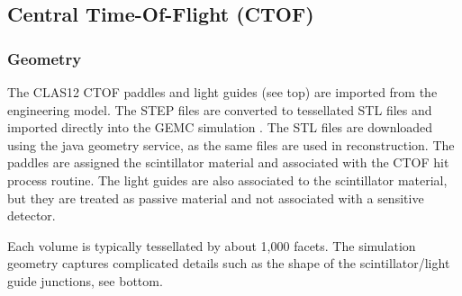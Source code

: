 \subsection{Central Time-Of-Flight (CTOF)} \label{sec:ctof}

\subsubsection{Geometry}

The CLAS12 CTOF paddles and light guides (see  top) are imported from the engineering model. The STEP files are converted to tessellated STL files and imported
directly into the GEMC simulation \cite{gemcCad}. The STL files are downloaded using the java geometry service, as the same files are used in reconstruction.
The paddles are assigned the scintillator material and associated with the CTOF hit process routine.
The light guides are also associated to the scintillator material, but they are treated as passive material and not associated with a sensitive detector.

Each volume is typically tessellated by about 1,000 facets. The simulation geometry captures complicated details such as the shape of the scintillator/light guide
junctions, see  bottom.

